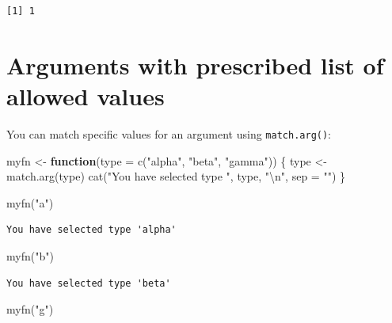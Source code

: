 \documentclass[
]{book}
\newenvironment{Shaded}{\begin{snugshade}}{\end{snugshade}}
\newcommand{\AttributeTok}[1]{\textcolor[rgb]{0.77,0.63,0.00}{#1}}
\newcommand{\ControlFlowTok}[1]{\textcolor[rgb]{0.13,0.29,0.53}{\textbf{#1}}}
\newcommand{\FunctionTok}[1]{\textcolor[rgb]{0.00,0.00,0.00}{#1}}
\newcommand{\NormalTok}[1]{#1}
\newcommand{\OtherTok}[1]{\textcolor[rgb]{0.56,0.35,0.01}{#1}}
\newcommand{\SpecialCharTok}[1]{\textcolor[rgb]{0.00,0.00,0.00}{#1}}
\newcommand{\StringTok}[1]{\textcolor[rgb]{0.31,0.60,0.02}{#1}}
\begin{document}
\begin{verbatim}
[1] 1
\end{verbatim}

\hypertarget{arguments-with-prescribed-list-of-allowed-values}{%
\section{Arguments with prescribed list of allowed values}\label{arguments-with-prescribed-list-of-allowed-values}}

You can match specific values for an argument using \texttt{match.arg()}:

\begin{Shaded}
\begin{Highlighting}[]
\NormalTok{myfn }\OtherTok{\textless{}{-}} \ControlFlowTok{function}\NormalTok{(}\AttributeTok{type =} \FunctionTok{c}\NormalTok{(}\StringTok{"alpha"}\NormalTok{, }\StringTok{"beta"}\NormalTok{, }\StringTok{"gamma"}\NormalTok{)) \{}
\NormalTok{  type }\OtherTok{\textless{}{-}} \FunctionTok{match.arg}\NormalTok{(type)}
  \FunctionTok{cat}\NormalTok{(}\StringTok{"You have selected type \textquotesingle{}"}\NormalTok{, type, }\StringTok{"\textquotesingle{}}\SpecialCharTok{\textbackslash{}n}\StringTok{"}\NormalTok{, }\AttributeTok{sep =} \StringTok{""}\NormalTok{)}
\NormalTok{\}}

\FunctionTok{myfn}\NormalTok{(}\StringTok{"a"}\NormalTok{)}
\end{Highlighting}
\end{Shaded}

\begin{verbatim}
You have selected type 'alpha'
\end{verbatim}

\begin{Shaded}
\begin{Highlighting}[]
\FunctionTok{myfn}\NormalTok{(}\StringTok{"b"}\NormalTok{)}
\end{Highlighting}
\end{Shaded}

\begin{verbatim}
You have selected type 'beta'
\end{verbatim}

\begin{Shaded}
\begin{Highlighting}[]
\FunctionTok{myfn}\NormalTok{(}\StringTok{"g"}\NormalTok{)}
\end{Highlighting}
\end{Shaded}
\end{document}
